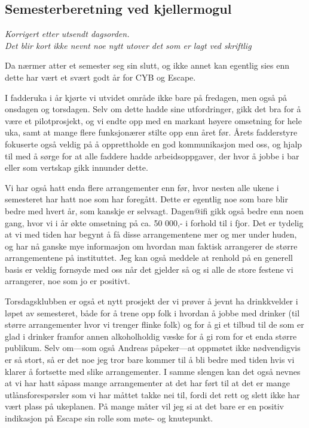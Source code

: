 \documentclass[10pt,norsk,a4paper]{article}
\begin{document}
\newpage


\subsection{Semesterberetning ved kjellermogul}
\textit{\small Korrigert etter utsendt dagsorden.}\\

\textit{Det blir kort ikke nevnt noe nytt utover det som er lagt ved
skriftlig}\\
\begin{multicols}{2}
	Da nærmer atter et semester seg sin slutt, og ikke annet kan egentlig sies enn dette har vært et svært godt år for CYB og Escape.

	I fadderuka i år kjørte vi utvidet område ikke bare på fredagen, men også på onsdagen og torsdagen. Selv om dette hadde sine utfordringer, gikk det bra for å være et pilotprosjekt, og vi endte opp med en markant høyere omsetning for hele uka, samt at mange flere funksjonærer stilte opp enn året før. Årets fadderstyre fokuserte også veldig på å opprettholde en god kommunikasjon med oss, og hjalp til med å sørge for at alle faddere hadde arbeidsoppgaver, der hvor å jobbe i bar eller som vertskap gikk innunder dette.

	Vi har også hatt enda flere arrangementer enn før, hvor nesten alle ukene i semesteret har hatt noe som har foregått. Dette er egentlig noe som bare blir bedre med hvert år, som kanskje er selvsagt. Dagen@ifi gikk også bedre enn noen gang, hvor vi i år økte omsetning på ca. 50 000,- i forhold til i fjor. Det er tydelig at vi med tiden har begynt å få disse arrangementene mer og mer under huden, og har nå ganske mye informasjon om hvordan man faktisk arrangerer de større arrangementene på instituttet. Jeg kan også meddele at renhold på en generell basis er veldig fornøyde med oss når det gjelder så og si alle de store festene vi arrangerer, noe som jo er positivt.

	Torsdagsklubben er også et nytt prosjekt der vi prøver å jevnt ha drinkkvelder i løpet av semesteret, både for å trene opp folk i hvordan å jobbe med drinker (til større arrangementer hvor vi trenger flinke folk) og for å gi et tilbud til de som er glad i drinker framfor annen alkoholholdig væske for å gi rom for et enda større publikum. Selv om---som også Andreas påpeker---at oppmøtet ikke nødvendigvis er så stort, så er det noe jeg tror bare kommer til å bli bedre med tiden hvis vi klarer å fortsette med slike arrangementer. I samme slengen kan det også nevnes at vi har hatt såpass mange arrangementer at det har ført til at det er mange utlånsforespørsler som vi har måttet takke nei til, fordi det rett og slett ikke har vært plass på ukeplanen. På mange måter vil jeg si at det bare er en positiv indikasjon på Escape sin rolle som møte- og knutepunkt.


\end{multicols}
\end{document}
